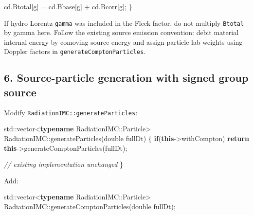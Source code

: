 \documentclass[
]{article}
\newenvironment{Shaded}{}{}
\newcommand{\BuiltInTok}[1]{\textcolor[rgb]{0.00,0.50,0.00}{#1}}
\newcommand{\CommentTok}[1]{\textcolor[rgb]{0.38,0.63,0.69}{\textit{#1}}}
\newcommand{\ControlFlowTok}[1]{\textcolor[rgb]{0.00,0.44,0.13}{\textbf{#1}}}
\newcommand{\DataTypeTok}[1]{\textcolor[rgb]{0.56,0.13,0.00}{#1}}
\newcommand{\KeywordTok}[1]{\textcolor[rgb]{0.00,0.44,0.13}{\textbf{#1}}}
\newcommand{\NormalTok}[1]{#1}
\newcommand{\OperatorTok}[1]{\textcolor[rgb]{0.40,0.40,0.40}{#1}}
\begin{document}
\begin{Shaded}
\begin{Highlighting}[]
\NormalTok{    cd}\OperatorTok{.}\NormalTok{Btotal}\OperatorTok{[}\NormalTok{g}\OperatorTok{]} \OperatorTok{=}\NormalTok{ cd}\OperatorTok{.}\NormalTok{Bbase}\OperatorTok{[}\NormalTok{g}\OperatorTok{]} \OperatorTok{+}\NormalTok{ cd}\OperatorTok{.}\NormalTok{Bcorr}\OperatorTok{[}\NormalTok{g}\OperatorTok{];}
\OperatorTok{\}}
\end{Highlighting}
\end{Shaded}

If hydro Lorentz \texttt{gamma} was included in the Fleck factor, do not
multiply \texttt{Btotal} by gamma here. Follow the existing source
emission convention: debit material internal energy by comoving source
energy and assign particle lab weights using Doppler factors in
\texttt{generateComptonParticles}.

\subsection{6. Source-particle generation with signed group
source}\label{source-particle-generation-with-signed-group-source}

Modify \texttt{RadiationIMC::generateParticles}:

\begin{Shaded}
\begin{Highlighting}[]
\BuiltInTok{std::}\NormalTok{vector}\OperatorTok{\textless{}}\KeywordTok{typename}\NormalTok{ RadiationIMC}\OperatorTok{::}\NormalTok{Particle}\OperatorTok{\textgreater{}}\NormalTok{ RadiationIMC}\OperatorTok{::}\NormalTok{generateParticles}\OperatorTok{(}\DataTypeTok{double}\NormalTok{ fullDt}\OperatorTok{)}
\OperatorTok{\{}
    \ControlFlowTok{if}\OperatorTok{(}\KeywordTok{this}\OperatorTok{{-}\textgreater{}}\NormalTok{withCompton}\OperatorTok{)}
        \ControlFlowTok{return} \KeywordTok{this}\OperatorTok{{-}\textgreater{}}\NormalTok{generateComptonParticles}\OperatorTok{(}\NormalTok{fullDt}\OperatorTok{);}

    \CommentTok{// existing implementation unchanged}
\OperatorTok{\}}
\end{Highlighting}
\end{Shaded}

Add:

\begin{Shaded}
\begin{Highlighting}[]
\BuiltInTok{std::}\NormalTok{vector}\OperatorTok{\textless{}}\KeywordTok{typename}\NormalTok{ RadiationIMC}\OperatorTok{::}\NormalTok{Particle}\OperatorTok{\textgreater{}}\NormalTok{ RadiationIMC}\OperatorTok{::}\NormalTok{generateComptonParticles}\OperatorTok{(}\DataTypeTok{double}\NormalTok{ fullDt}\OperatorTok{);}
\end{Highlighting}
\end{Shaded}
\end{document}
